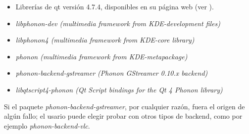 		\begin{itemize}
			\item Librerías de qt versión 4.7.4, disponibles en su página web (ver \cite{qtlibs}).		
			\item \emph{libphonon-dev (multimedia framework from KDE-development files)} 
			\item \emph{libphonon4 (multimedia framework from KDE-core library)}
			\item \emph{phonon (multimedia framework from KDE-metapackage)}
			\item \emph{phonon-backend-gstreamer (Phonon GStreamer 0.10.x backend)}
			\item \emph{libqtscript4-phonon (Qt Script bindings for the Qt 4 Phonon library)}
			
		\end{itemize}
	
		Si el paquete \emph{phonon-backend-gstreamer}, por cualquier razón, fuera el origen de algún fallo; el usario puede elegir probar con otros tipos de backend, como por ejemplo \emph{phonon-backend-vlc}.
		
		
